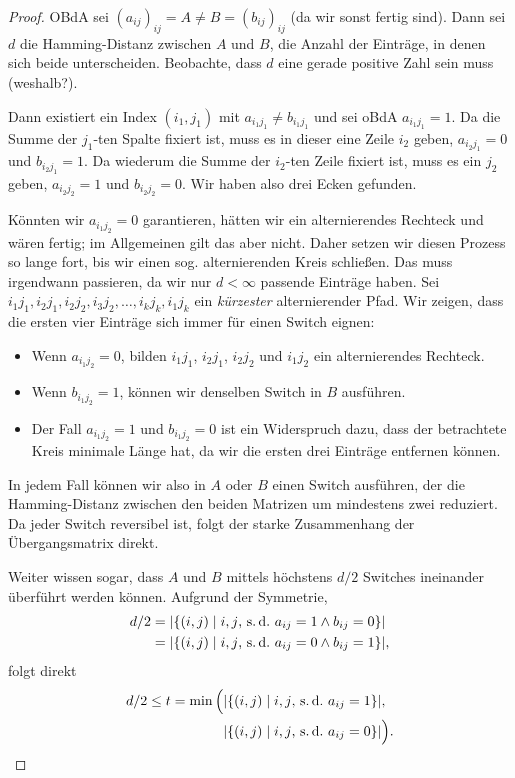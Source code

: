\begin{proof}
    OBdA sei $(a_{ij})_{ij} = A \ne B = (b_{ij})_{ij}$ (da wir sonst fertig sind).
    Dann sei $d$ die Hamming-Distanz zwischen $A$ und $B$, \dh die Anzahl der Einträge, in denen sich beide unterscheiden.
    Beobachte, dass $d$ eine gerade positive Zahl sein muss (weshalb?).

    Dann existiert ein Index $(i_1, j_1)$ mit $a_{i_1j_1} \ne b_{i_1j_1}$ und sei oBdA $a_{i_1j_1} = 1$.
    Da die Summe der $j_1$-ten Spalte fixiert ist, muss es in dieser eine Zeile $i_2$ geben, \sd $a_{i_2j_1} = 0$ und $b_{i_2j_1} = 1$.
    Da wiederum die Summe der $i_2$-ten Zeile fixiert ist, muss es ein $j_2$ geben, \sd $a_{i_2j_2} = 1$ und $b_{i_2j_2} = 0$.
    Wir haben also drei Ecken gefunden.

    Könnten wir $a_{i_1j_2} = 0$ garantieren, hätten wir ein alternierendes Rechteck und wären fertig;
    im Allgemeinen gilt das aber nicht.
    Daher setzen wir diesen Prozess so lange fort, bis wir einen sog. alternierenden Kreis schließen.
    Das muss irgendwann passieren, da wir nur $d < \infty$ passende Einträge haben.
    Sei $i_1j_1, i_2j_1, i_2j_2, i_3j_2, \ldots, i_kj_k, i_1j_k$ ein \emph{kürzester} alternierender Pfad.
    Wir zeigen, dass die ersten vier Einträge sich immer für einen Switch eignen:
    \begin{itemize}
        \item Wenn $a_{i_1j_2} = 0$, bilden $i_1j_1$, $i_2j_1$, $i_2j_2$ und $i_1j_2$ ein alternierendes Rechteck.
        \item Wenn $b_{i_1j_2} = 1$, können wir denselben Switch in $B$ ausführen.
        \item Der Fall $a_{i_1j_2} = 1$ und $b_{i_1j_2} = 0$ ist ein Widerspruch dazu, dass der betrachtete Kreis minimale Länge hat, da wir die ersten drei Einträge entfernen können.
    \end{itemize}

    In jedem Fall können wir also in $A$ oder $B$ einen Switch ausführen, der die Hamming-Distanz zwischen den beiden Matrizen um mindestens zwei reduziert.
    Da jeder Switch reversibel ist, folgt der starke Zusammenhang der Übergangsmatrix direkt.

    Weiter wissen sogar, dass $A$ und $B$ mittels höchstens $d/2$ Switches ineinander überführt werden können.
    Aufgrund der Symmetrie,
    \begin{align}
        d/2 & = \card{\set{ (i, j) \mid i, j \text{, \sd\ } a_{ij} = 1 \land b_{ij} = 0}}  \\
            & = \card{\set{ (i, j) \mid i, j \text{, \sd\ } a_{ij} = 0 \land b_{ij} = 1}},
    \end{align}
    folgt direkt
    \begin{align}
        d/2 \le t =  \min\Big(
         & \card{\set{ (i, j) \mid i, j \text{, \sd\ } a_{ij} = 1}},       \\
         & \card{\set{ (i, j) \mid i, j \text{, \sd\ } a_{ij} = 0}}  \Big).
    \end{align}
\end{proof}

